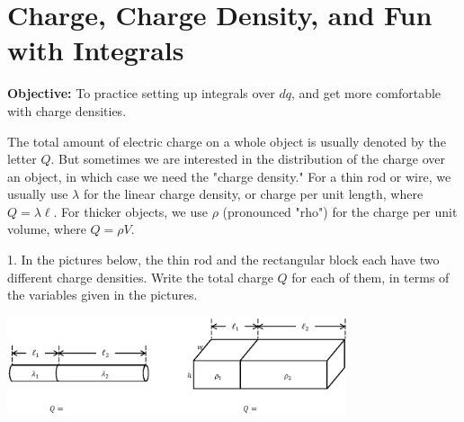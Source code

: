 \section{Charge, Charge Density, and Fun with Integrals}

\makelabheader %

\vspace{0.1in}
\textbf{Objective:} To practice setting up integrals over $dq$, and get more comfortable with charge densities.

\vspace{0.1in}
The total amount of electric charge on a whole object is usually denoted by the letter $Q$. But sometimes we are interested in the distribution of the charge over an object, in which case we need the "charge density."  For a thin rod or wire, we usually use $\lambda$ for the linear charge density, or charge per unit length, where $Q = \lambda \ell$. For thicker objects, we use $\rho$ (pronounced "rho") for the charge per unit volume, where $Q = \rho V$. 

1. In the pictures below, the thin rod and the rectangular block each have two different charge densities.  Write the total charge $Q$ for each of them, in terms of the variables given in the pictures.
\begin{center}
\includegraphics[width=0.75\textwidth]{charge_density/fig1.eps}
\end{center}

